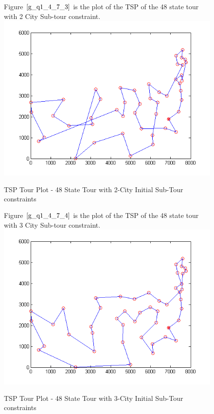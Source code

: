 \documentclass[twoside,12pt]{article}
\begin{document}
\begin{figure}[!htbp]
\centering
Figure $\eqref{g_q1_4_7_3}$ is the plot of the TSP of the 48 state tour with 2 City Sub-tour constraint. 
 \includegraphics[scale=1.4]{2_city/all_48_with_2} 
\caption{TSP Tour Plot - 48 State Tour with 2-City Initial Sub-Tour constraints}
\label{g_q1_4_7_3}
\end{figure}
\FloatBarrier


\begin{figure}[!htbp]
\centering
Figure $\eqref{g_q1_4_7_4}$ is the plot of the TSP of the 48 state tour with 3 City Sub-tour constraint. 
 \includegraphics[scale=1.4]{3_city/all_48_with_3} 
\caption{TSP Tour Plot - 48 State Tour with 3-City Initial Sub-Tour constraints}
\label{g_q1_4_7_4}
\end{figure}
\FloatBarrier
\end{document}
